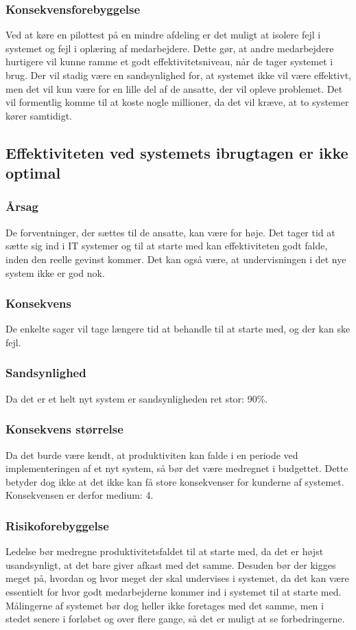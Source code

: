 \documentclass[10pt,a4paper,danish]{article}
\begin{document}
\subsubsection{Konsekvensforebyggelse}
Ved at køre en pilottest på en mindre afdeling er det muligt at isolere fejl i systemet og fejl i oplæring af medarbejdere. 
Dette gør, at andre medarbejdere hurtigere vil kunne ramme et godt effektivitetsniveau, når de tager systemet i brug.
Der vil stadig være en sandsynlighed for, at systemet ikke vil være effektivt, men det vil kun være for en lille del af de ansatte, der vil opleve problemet. Det vil formentlig komme til at koste nogle millioner, da det vil kræve, at to systemer kører samtidigt.

\subsection{Effektiviteten ved systemets ibrugtagen er ikke optimal}
\subsubsection{Årsag}
De forventninger, der sættes til de ansatte, kan være for høje. Det tager tid at sætte sig ind i IT systemer og til at starte med kan effektiviteten godt falde, inden den reelle gevinst kommer. Det kan også være, at undervisningen i det nye system ikke er god nok.

\subsubsection{Konsekvens}
De enkelte sager vil tage længere tid at behandle til at starte med, og der kan ske fejl.

\subsubsection{Sandsynlighed}
Da det er et helt nyt system er sandsynligheden ret stor: 90\%.

\subsubsection{Konsekvens størrelse}
Da det burde være kendt, at produktiviten kan falde i en periode ved implementeringen af et nyt system, så bør det være medregnet i budgettet. Dette betyder dog ikke at det ikke kan få store konsekvenser for kunderne af systemet. Konsekvensen er derfor medium: 4.

\subsubsection{Risikoforebyggelse}
Ledelse bør medregne produktivitetsfaldet til at starte med, da det er højst usandsynligt, at det bare giver afkast med det samme. Desuden bør der kigges meget på, hvordan og hvor meget der skal undervises i systemet, da det kan være essentielt for hvor godt medarbejderne kommer ind i systemet til at starte med. Målingerne af systemet bør dog heller ikke foretages med det samme, men i stedet senere i forløbet og over flere gange, så det er muligt at se forbedringerne. 
\end{document}
